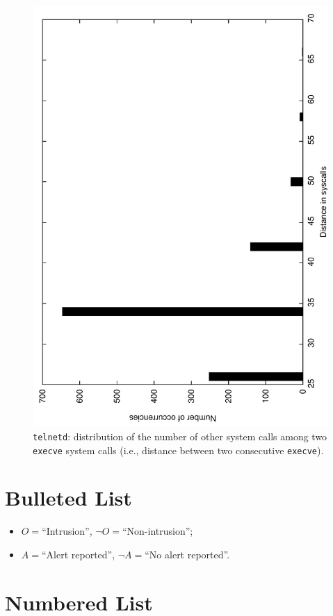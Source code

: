 \begin{figure}[h]
\centering
\includegraphics[angle=-90,width=.8\textwidth]{Figures/telnet.pdf}
\caption{\texttt{telnetd}: distribution of the number of other system calls among two \texttt{execve} system calls (i.e., distance between two consecutive \texttt{execve}).}
\label{fig:exectelnet}
\end{figure}


\section{Bulleted List}

\begin{itemize}
\item $O = $``Intrusion'', $\neg O =$``Non-intrusion'';
\item $A = $``Alert reported'', $\neg A =$``No alert reported''.
\end{itemize}


\section{Numbered List}

